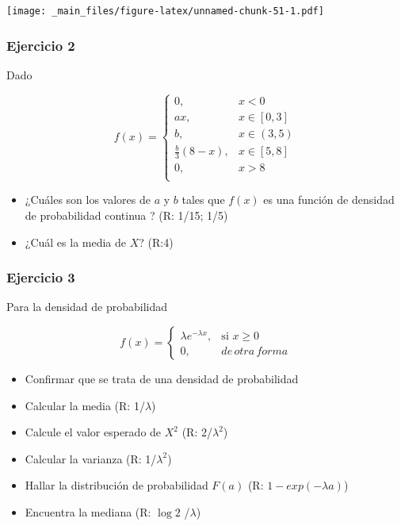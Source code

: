 \documentclass[
]{book}
\providecommand{\tightlist}{%
  \setlength{\itemsep}{0pt}\setlength{\parskip}{0pt}}
\begin{document}
\texttt{[image: \_main\_files/figure-latex/unnamed-chunk-51-1.pdf]}

\hypertarget{ejercicio-2-3}{%
\subsubsection{Ejercicio 2}\label{ejercicio-2-3}}

Dado

\[
    f(x)= 
\begin{cases}
0, & x < 0 \\
ax, & x \in [0,3] \\
b, & x \in (3,5) \\
\frac{b}{3}(8-x),& x \in [5,8]\\
0, & x > 8 \\
\end{cases}
\]

\begin{itemize}
\item
  ¿Cuáles son los valores de \(a\) y \(b\) tales que \(f(x)\) es una función de densidad de probabilidad continua ? (R: 1/15; 1/5)
\item
  ¿Cuál es la media de \(X\)? (R:4)
\end{itemize}

\hypertarget{ejercicio-3-3}{%
\subsubsection{Ejercicio 3}\label{ejercicio-3-3}}

Para la densidad de probabilidad

\[
    f(x)= 
\begin{cases}
    \lambda e^{-\lambda x},& \text{si } x \geq 0\\
    0,& de\, otra\, forma 
\end{cases}
\]

\begin{itemize}
\tightlist
\item
  Confirmar que se trata de una densidad de probabilidad
\item
  Calcular la media (R: 1/\(\lambda\))
\item
  Calcule el valor esperado de \(X^2\) (R: 2/\(\lambda^2\))
\item
  Calcular la varianza (R: 1/\(\lambda^2\))
\item
  Hallar la distribución de probabilidad \(F(a)\) (R: \(1- exp( -\lambda a)\))
\item
  Encuentra la mediana (R: \(\log{ 2}\) /\(\lambda\))
\end{itemize}
\end{document}
